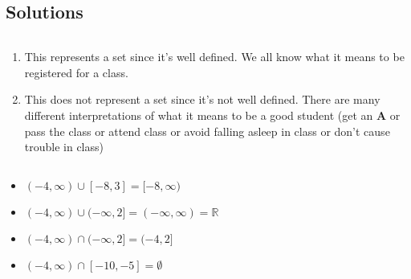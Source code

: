 \subsection*{Solutions}

\begin{solution}
	\label{sol:which_of_the_following_represent_a_set}$ $

	\begin{enumerate}
		\label{enum:sets_and_numbers_example_solution}

		\item This represents a set since it's well defined. We all know what it
		      means to be registered for a class.
		\item This does not represent a set since it's not well defined. There are
		      many different interpretations of what it means to be a good student
		      (get an \textbf{A} or pass the class or attend class or avoid falling
		      asleep in class or don't cause trouble in class)
	\end{enumerate}
\end{solution}

\begin{solution}
	\label{sol:simplify_the_following_expressions}$ $

	\begin{itemize}
		\label{item:simplify_the_following_expressions_solutions}

		\item $(-4, \infty) \cup [-8, 3] = [-8, \infty)$
		\item $(-4, \infty) \cup (-\infty, 2] = (-\infty, \infty) = \mathbb{R}$
		\item $(-4, \infty) \cap (-\infty, 2] = (-4, 2]$
		\item $(-4, \infty) \cap [-10, -5] = \emptyset$
	\end{itemize}
\end{solution}

